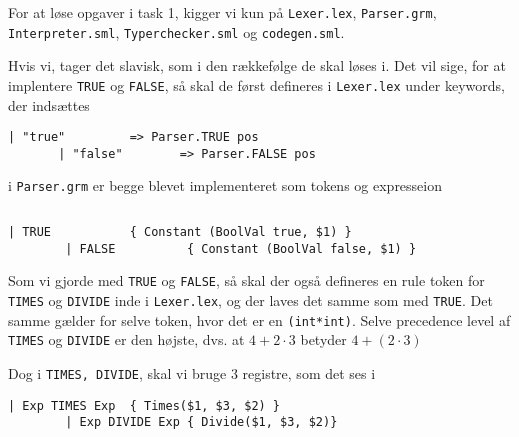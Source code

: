 \documentclass[11pt,a4paper,oneside]{report}
\begin{document}

\setcounter{page}{0}
\renewcommand\thepage{\roman{page}}



\tableofcontents

\newpage

\setcounter{page}{1}
\renewcommand\thepage{\arabic{page}}


For at løse opgaver i task 1, kigger vi kun på \texttt{Lexer.lex}, \texttt{Parser.grm}, \texttt{Interpreter.sml}, \texttt{Typerchecker.sml} og \texttt{codegen.sml}.

Hvis vi, tager det slavisk, som i den rækkefølge de skal løses i. Det vil sige, for at implentere \texttt{TRUE} og \texttt{FALSE}, så skal de først defineres i \texttt{Lexer.lex} under keywords, der indsættes

\begin{lstlisting}[firstnumber=42]
       | "true"         => Parser.TRUE pos
       | "false"        => Parser.FALSE pos
\end{lstlisting}

i \texttt{Parser.grm} er begge blevet implementeret som tokens og expresseion

\begin{lstlisting}[firstnumber=13]
%token <(int*int)> TRUE FALSE
\end{lstlisting}
\begin{lstlisting}[mathescape=false,firstnumber=68]
        | TRUE           { Constant (BoolVal true, $1) }
        | FALSE          { Constant (BoolVal false, $1) }
\end{lstlisting}

Som vi gjorde med \texttt{TRUE} og \texttt{FALSE}, så skal der også defineres en rule token for \texttt{TIMES} og \texttt{DIVIDE} inde i \texttt{Lexer.lex}, og der laves det samme som med \texttt{TRUE}. Det samme gælder for selve token, hvor det er en \texttt{(int*int)}. Selve precedence level af \texttt{TIMES} og \texttt{DIVIDE} er den højste, dvs. at $4 + 2 \cdot 3$ betyder $4 + (2 \cdot 3)$

Dog i \texttt{TIMES, DIVIDE}, skal vi bruge 3 registre, som det ses i 

\begin{lstlisting}[mathescape=false]
        | Exp TIMES Exp  { Times($1, $3, $2) }
        | Exp DIVIDE Exp { Divide($1, $3, $2)}
\end{lstlisting}




\clearpage
{}


\end{document}
